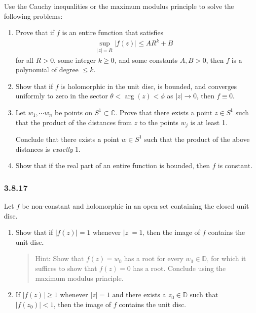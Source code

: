 Use the Cauchy inequalities or the maximum modulus principle to solve
the following problems:

\begin{enumerate}
\def\labelenumi{\alph{enumi}.}
\item
  Prove that if \(f\) is an entire function that satisfies
  \begin{align*}
   \sup _{|z|=R}|f(z)| \leq A R^{k}+B
   \end{align*}
  for all \(R>0\), some integer \(k\geq 0\), and some constants
  \(A, B > 0\), then \(f\) is a polynomial of degree \(\leq k\).
\item
  Show that if \(f\) is holomorphic in the unit disc, is bounded, and
  converges uniformly to zero in the sector \(\theta < \arg(z) < \phi\)
  as \({\left\lvert {z} \right\rvert} \to 0\), then \(f \equiv 0\).
\item
  Let \(w_1, \cdots w_n\) be points on \(S^1 \subset {\mathbb{C}}\).
  Prove that there exists a point \(z\in S^1\) such that the product of
  the distances from \(z\) to the points \(w_j\) is at least 1.

  Conclude that there exists a point \(w\in S^1\) such that the product
  of the above distances is \emph{exactly} 1.
\item
  Show that if the real part of an entire function is bounded, then
  \(f\) is constant.
\end{enumerate}

\hypertarget{section-66}{%
\subsubsection{3.8.17}\label{section-66}}

Let \(f\) be non-constant and holomorphic in an open set containing the
closed unit disc.

\begin{enumerate}
\def\labelenumi{\alph{enumi}.}
\item
  Show that if \({\left\lvert {f(z)} \right\rvert} = 1\) whenever
  \({\left\lvert {z} \right\rvert} = 1\), then the image of \(f\)
  contains the unit disc.

  \begin{quote}
  Hint: Show that \(f(z) = w_0\) has a root for every
  \(w_0 \in {\mathbb{D}}\), for which it suffices to show that
  \(f(z) = 0\) has a root. Conclude using the maximum modulus principle.
  \end{quote}
\item
  If \({\left\lvert {f(z)} \right\rvert} \geq 1\) whenever
  \({\left\lvert {z} \right\rvert} = 1\) and there exists a
  \(z_0\in {\mathbb{D}}\) such that
  \({\left\lvert {f(z_0)} \right\rvert} < 1\), then the image of \(f\)
  contains the unit disc.
\end{enumerate}


